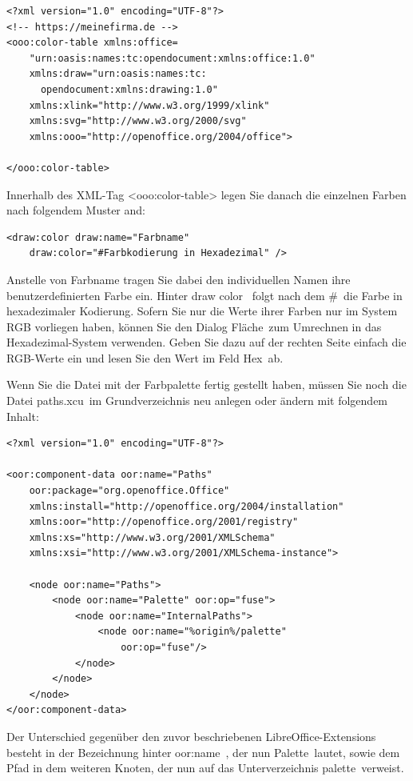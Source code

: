 \documentclass[a4paper,10pt,pagesize,titlepage]{scrbook}
\begin{document}
\begin{lstlisting}
<?xml version="1.0" encoding="UTF-8"?>
<!-- https://meinefirma.de -->
<ooo:color-table xmlns:office=
    "urn:oasis:names:tc:opendocument:xmlns:office:1.0"
    xmlns:draw="urn:oasis:names:tc:
      opendocument:xmlns:drawing:1.0"
    xmlns:xlink="http://www.w3.org/1999/xlink"
    xmlns:svg="http://www.w3.org/2000/svg"
    xmlns:ooo="http://openoffice.org/2004/office">
    
</ooo:color-table>
\end{lstlisting}

Innerhalb des XML-Tag <ooo:color-table> legen Sie danach die einzelnen Farben nach folgendem Muster and:

\begin{lstlisting}
<draw:color draw:name="Farbname" 
    draw:color="#Farbkodierung in Hexadezimal" />
\end{lstlisting}

Anstelle von Farbname tragen Sie dabei den individuellen Namen ihre benutzerdefinierten Farbe ein. Hinter \glqq draw color\grqq~ folgt nach dem \glqq \#\grqq~die Farbe in hexadezimaler Kodierung. Sofern Sie nur die Werte ihrer Farben nur im System RGB vorliegen haben, können Sie den Dialog \glqq Fläche\grqq~zum Umrechnen in das Hexadezimal-System verwenden. Geben Sie dazu auf der rechten Seite einfach die RGB-Werte ein und lesen Sie den Wert im Feld \glqq Hex\grqq~ab.

Wenn Sie die Datei mit der Farbpalette fertig gestellt haben, müssen Sie noch die Datei \glqq paths.xcu\grqq~im Grundverzeichnis neu anlegen oder ändern mit folgendem Inhalt:


\begin{lstlisting}
<?xml version="1.0" encoding="UTF-8"?>

<oor:component-data oor:name="Paths" 
    oor:package="org.openoffice.Office" 
    xmlns:install="http://openoffice.org/2004/installation" 
    xmlns:oor="http://openoffice.org/2001/registry"
    xmlns:xs="http://www.w3.org/2001/XMLSchema" 
    xmlns:xsi="http://www.w3.org/2001/XMLSchema-instance">

    <node oor:name="Paths">
        <node oor:name="Palette" oor:op="fuse">
            <node oor:name="InternalPaths">
                <node oor:name="%origin%/palette" 
                    oor:op="fuse"/>
            </node>
        </node>
    </node>
</oor:component-data>
\end{lstlisting}

Der Unterschied gegenüber den zuvor beschriebenen LibreOffice-Extensions besteht in der Bezeichnung hinter \glqq oor:name\grqq~, der nun \glqq Palette\grqq~lautet, sowie dem Pfad in dem weiteren Knoten, der nun auf das Unterverzeichnis \glqq palette\grqq~verweist.
\end{document}
